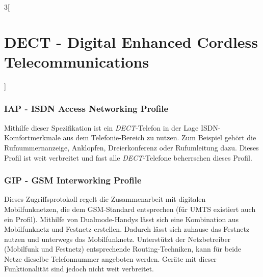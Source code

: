 \begin{multicols}{3}[\section{DECT - Digital Enhanced Cordless Telecommunications}]
\subsubsection*{IAP - ISDN Access Networking Profile}
Mithilfe dieser Spezifikation ist ein \textit{DECT}-Telefon in der Lage ISDN-Komfortmerkmale aus dem Telefonie-Bereich zu nutzen. Zum Beispiel gehört die Rufnummernanzeige, Anklopfen, Dreierkonferenz oder Rufumleitung dazu. Dieses Profil ist weit verbreitet und fast alle \textit{DECT}-Telefone beherrschen dieses Profil. \cite{dect.1}

\subsubsection*{GIP - GSM Interworking Profile}
Dieses Zugriffsprotokoll regelt die Zusammenarbeit mit digitalen Mobilfunknetzen, die dem GSM-Standard entsprechen (für UMTS existiert auch ein Profil). Mithilfe von Dualmode-Handys lässt sich eine Kombination aus Mobilfunknetz und Festnetz erstellen. Dadurch lässt sich zuhause das Festnetz nutzen und unterwegs das Mobilfunknetz. Unterstützt der Netzbetreiber (Mobilfunk und Festnetz) entsprechende Routing-Techniken, kann für beide Netze dieselbe Telefonnummer angeboten werden. Geräte mit dieser Funktionalität sind jedoch nicht weit verbreitet. \cite{dect.1}

\end{multicols}
\newpage
